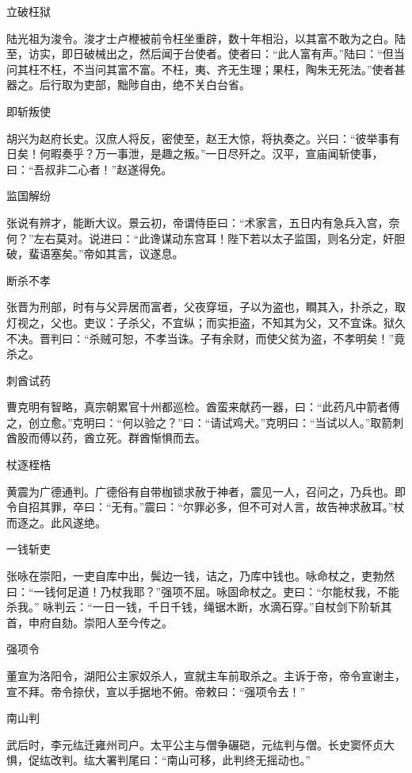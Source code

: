 \documentclass[a4paper,12pt,UTF8,twoside]{ctexbook}
\begin{document}
    立破枉狱
    
    陆光祖为浚令。浚才士卢楩被前令枉坐重辟，数十年相沿，以其富不敢为之白。陆至，访实，即日破械出之，然后闻于台使者。使者曰：“此人富有声。”陆曰：“但当问其枉不枉，不当问其富不富。不枉，夷、齐无生理；果枉，陶朱无死法。”使者甚器之。后行取为吏部，黜陟自由，绝不关白台省。
    
    即斩叛使
    
    胡兴为赵府长史。汉庶人将反，密使至，赵王大惊，将执奏之。兴曰：“彼举事有日矣！何暇奏乎？万一事泄，是趣之叛。”一日尽歼之。汉平，宣庙闻斩使事，曰：“吾叔非二心者！”赵遂得免。
    
    监国解纷
    
    张说有辨才，能断大议。景云初，帝谓侍臣曰：“术家言，五日内有急兵入宫，奈何？”左右莫对。说进曰：“此谗谋动东宫耳！陛下若以太子监国，则名分定，奸胆破，蜚语塞矣。”帝如其言，议遂息。
    
    断杀不孝
    
    张晋为刑部，时有与父异居而富者，父夜穿垣，子以为盗也，瞷其入，扑杀之，取灯视之，父也。吏议：子杀父，不宜纵；而实拒盗，不知其为父，又不宜诛。狱久不决。晋判曰：“杀贼可恕，不孝当诛。子有余财，而使父贫为盗，不孝明矣！”竟杀之。
    
    刺酋试药
    
    曹克明有智略，真宗朝累官十州都巡检。酋蛮来献药一器，曰：“此药凡中箭者傅之，创立愈。”克明曰：“何以验之？”曰：“请试鸡犬。”克明曰：“当试以人。”取箭刺酋股而傅以药，酋立死。群酋惭惧而去。
    
    杖逐桎梏
    
    黄震为广德通判。广德俗有自带枷锁求赦于神者，震见一人，召问之，乃兵也。即令自招其罪，卒曰：“无有。”震曰：“尔罪必多，但不可对人言，故告神求赦耳。”杖而逐之。此风遂绝。
    
    一钱斩吏
    
    张咏在崇阳，一吏自库中出，鬓边一钱，诘之，乃库中钱也。咏命杖之，吏勃然曰：“一钱何足道！乃杖我耶？”强项不屈。咏固命杖之。吏曰：“尔能杖我，不能杀我。” 咏判云：“一日一钱，千日千钱，绳锯木断，水滴石穿。”自杖剑下阶斩其首，申府自劾。崇阳人至今传之。
    
    强项令
    
    董宣为洛阳令，湖阳公主家奴杀人，宣就主车前取杀之。主诉于帝，帝令宣谢主，宣不拜。帝令捺伏，宣以手据地不俯。帝敕曰：“强项令去！”
    
    南山判
    
    武后时，李元纮迁雍州司户。太平公主与僧争碾硙，元纮判与僧。长史窦怀贞大惧，促纮改判。纮大署判尾曰：“南山可移，此判终无摇动也。”
    
\end{document}
